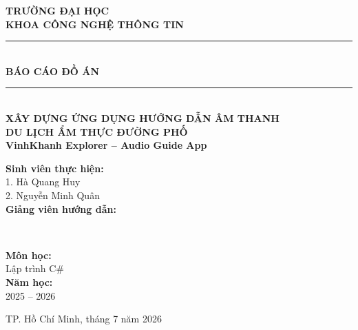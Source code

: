 \documentclass[a4paper,13pt]{report}
\begin{document}
\begin{titlepage}
\begin{center}

\textbf{\large TRƯỜNG ĐẠI HỌC} \\[0.3cm]
\textbf{\large KHOA CÔNG NGHỆ THÔNG TIN} \\[1.5cm]

\rule{\linewidth}{0.5mm} \\[0.5cm]
{\huge \bfseries BÁO CÁO ĐỒ ÁN} \\[0.3cm]
\rule{\linewidth}{0.5mm} \\[1.2cm]

{\LARGE \textbf{XÂY DỰNG ỨNG DỤNG HƯỚNG DẪN ÂM THANH\\DU LỊCH ẨM THỰC ĐƯỜNG PHỐ}}\\[0.4cm]
{\Large \textbf{VinhKhanh Explorer -- Audio Guide App}}\\[2cm]

\begin{minipage}{0.5\textwidth}
\begin{flushleft}
\textbf{Sinh viên thực hiện:}\\[0.3cm]
1. Hà Quang Huy\\
2. Nguyễn Minh Quân\\[1cm]
\textbf{Giảng viên hướng dẫn:}\\[0.3cm]
\end{flushleft}
\end{minipage}
~
\begin{minipage}{0.4\textwidth}
\begin{flushright}
\textbf{Môn học:}\\[0.3cm]
Lập trình C\#\\[1cm]
\textbf{Năm học:}\\[0.3cm]
2025 -- 2026
\end{flushright}
\end{minipage}

\vfill
{\large TP. Hồ Chí Minh, tháng 7 năm 2026}

\end{center}
\end{titlepage}

\tableofcontents
\newpage

\end{document}
